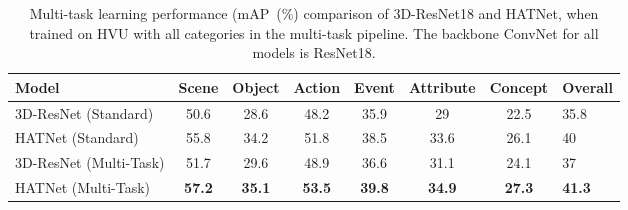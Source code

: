 \documentclass[runningheads]{llncs}
\begin{document}
\begin{table*}[t] 
\centering
\small
\tabcolsep=0.15cm
\caption{MAP~(\%) performance of different architecture on the HVU dataset. The backbone ConvNet for all models is ResNet18.}
\label{table:baselines}
\end{table*}
%
 


\begin{table}[t] 
\centering
\small
\tabcolsep=0.10cm
\begin{tabular}{ l|c c c c c c| l }
\toprule
Model &  Scene & Object& Action & Event & Attribute & Concept & Overall\\
\hline \hline 3D-ResNet (Standard)  & 50.6 &	28.6&	48.2&	35.9&	29&	22.5& 35.8 \\
HATNet (Standard)& {55.8}&	{34.2}&	{51.8}	&{38.5}&{33.6}&{26.1}&{40}\\
\hline 3D-ResNet (Multi-Task) & 51.7 & 29.6&  48.9& 36.6& 31.1 & 24.1& 37\\
HATNet (Multi-Task)& \textbf{57.2}& \textbf{35.1} & \textbf{53.5} & \textbf{39.8}& \textbf{34.9}& \textbf{27.3} & \textbf{41.3} \\
\bottomrule
\end{tabular}
\caption{Multi-task learning performance (mAP~(\%) comparison of 3D-ResNet18 and HATNet, when trained on HVU with all categories in the multi-task pipeline. The backbone ConvNet for all models is ResNet18.}
\label{table:multitask}
\vspace{-0.7cm}
\end{table}

\begin{table}[t] 
\centering
\small
\tabcolsep=0.15cm
\caption{Performance (mAP~(\%)) comparison of HVU and Kinetics datasets for transfer learning generalization ability when evaluated on different action recognition dataset. The trained model for all of the datasets is 3D-ResNet18.}
\label{table:TFlearn}
\end{table}
\end{document}
